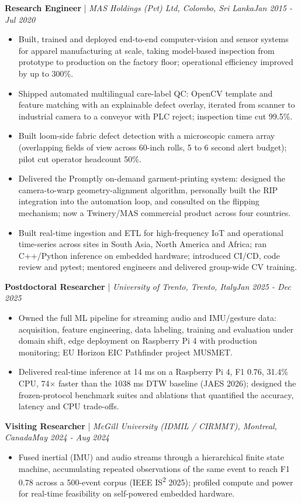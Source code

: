 \documentclass[11pt]{article}
\newenvironment{cvrole}[5]{%
  \par\noindent\textbf{\large #1} | \textit{\small #2, #3}\hfill \textit{\small #4 - #5}\par
  \begin{itemize}[leftmargin=2em, itemsep=-0.3em, topsep=-0.5em]%
}{%
  \end{itemize}\par\noindent\mbox{}\par\vspace{0.1em}%
}
\begin{document}
\begin{cvrole}{Research Engineer}{MAS Holdings (Pvt) Ltd}{Colombo, Sri Lanka}{Jan 2015}{Jul 2020}
    \item Built, trained and deployed end-to-end computer-vision and sensor systems for apparel manufacturing at scale, taking model-based inspection from prototype to production on the factory floor; operational efficiency improved by up to 300\%.
    \item Shipped automated multilingual care-label QC: OpenCV template and feature matching with an explainable defect overlay, iterated from scanner to industrial camera to a conveyor with PLC reject; inspection time cut 99.5\%.
    \item Built loom-side fabric defect detection with a microscopic camera array (overlapping fields of view across 60-inch rolls, 5 to 6 second alert budget); pilot cut operator headcount 50\%.
    \item Delivered the Promptly on-demand garment-printing system: designed the camera-to-warp geometry-alignment algorithm, personally built the RIP integration into the automation loop, and consulted on the flipping mechanism; now a Twinery/MAS commercial product across four countries.
    \item Built real-time ingestion and ETL for high-frequency IoT and operational time-series across sites in South Asia, North America and Africa; ran C++/Python inference on embedded hardware; introduced CI/CD, code review and pytest; mentored engineers and delivered group-wide CV training.
\end{cvrole}

\begin{cvrole}{Postdoctoral Researcher}{University of Trento}{Trento, Italy}{Jan 2025}{Dec 2025}
    \item Owned the full ML pipeline for streaming audio and IMU/gesture data: acquisition, feature engineering, data labeling, training and evaluation under domain shift, edge deployment on Raspberry Pi 4 with production monitoring; EU Horizon EIC Pathfinder project MUSMET.
    \item Delivered real-time inference at 14 ms on a Raspberry Pi 4, F1 0.76, 31.4\% CPU, 74$\times$ faster than the 1038 ms DTW baseline (JAES 2026); designed the frozen-protocol benchmark suites and ablations that quantified the accuracy, latency and CPU trade-offs.
\end{cvrole}

\begin{cvrole}{Visiting Researcher}{McGill University (IDMIL / CIRMMT)}{Montreal, Canada}{May 2024}{Aug 2024}
    \item Fused inertial (IMU) and audio streams through a hierarchical finite state machine, accumulating repeated observations of the same event to reach F1 0.78 across a 500-event corpus (IEEE IS\textsuperscript{2} 2025); profiled compute and power for real-time feasibility on self-powered embedded hardware.
\end{cvrole}
\end{document}
